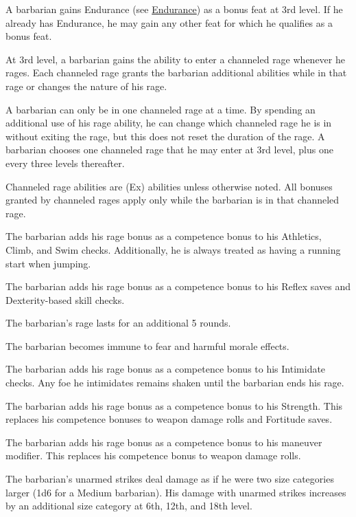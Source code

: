  A barbarian gains Endurance (see \hyperlink{feat:Endurance}{Endurance}) as a bonus feat at 3rd level. If he already has Endurance, he may gain any other feat for which he qualifies as a bonus feat.

 At 3rd level, a barbarian gains the ability to enter a channeled rage whenever he rages. Each channeled rage grants the barbarian additional abilities while in that rage or changes the nature of his rage.
\par A barbarian can only be in one channeled rage at a time. By spending an additional use of his rage ability, he can change which channeled rage he is in without exiting the rage, but this does not reset the duration of the rage. A barbarian chooses one channeled rage that he may enter at 3rd level, plus one every three levels thereafter.
\par Channeled rage abilities are (Ex) abilities unless otherwise noted. All bonuses granted by channeled rages apply only while the barbarian is in that channeled rage.

 The barbarian adds his rage bonus as a competence bonus to his Athletics, Climb, and Swim checks. Additionally, he is always treated as having a running start when jumping.

 The barbarian adds his rage bonus as a competence bonus to his Reflex saves and Dexterity-based skill checks.

 The barbarian's rage lasts for an additional 5 rounds.

 The barbarian becomes immune to fear and harmful morale effects.

 The barbarian adds his rage bonus as a competence bonus to his Intimidate checks. Any foe he intimidates remains shaken until the barbarian ends his rage.

 The barbarian adds his rage bonus as a competence bonus to his Strength. This replaces his competence bonuses to weapon damage rolls and Fortitude saves.

 The barbarian adds his rage bonus as a competence bonus to his maneuver modifier. This replaces his competence bonus to weapon damage rolls.

 The barbarian's unarmed strikes deal damage as if he were two size categories larger (1d6 for a Medium barbarian). His damage with unarmed strikes increases by an additional size category at 6th, 12th, and 18th level.

